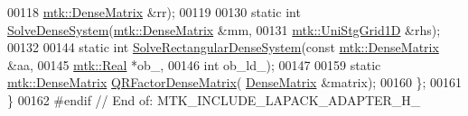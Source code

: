 \begin{DoxyCode}
00118                               \hyperlink{classmtk_1_1DenseMatrix}{mtk::DenseMatrix} &rr);
00119 
00130   \textcolor{keyword}{static} \textcolor{keywordtype}{int} \hyperlink{classmtk_1_1LAPACKAdapter_a7428bccf74fd4a4af68fb7233846da22}{SolveDenseSystem}(\hyperlink{classmtk_1_1DenseMatrix}{mtk::DenseMatrix} &mm,
00131                               \hyperlink{classmtk_1_1UniStgGrid1D}{mtk::UniStgGrid1D} &rhs);
00132 
00144   \textcolor{keyword}{static} \textcolor{keywordtype}{int} \hyperlink{classmtk_1_1LAPACKAdapter_a380f148ffdf96bae2f79ae28f1a6560c}{SolveRectangularDenseSystem}(\textcolor{keyword}{const} 
      \hyperlink{classmtk_1_1DenseMatrix}{mtk::DenseMatrix} &aa,
00145                                          \hyperlink{group__c01-roots_gac080bbbf5cbb5502c9f00405f894857d}{mtk::Real} *ob\_,
00146                                          \textcolor{keywordtype}{int} ob\_ld\_);
00147 
00159   \textcolor{keyword}{static} \hyperlink{classmtk_1_1DenseMatrix}{mtk::DenseMatrix} \hyperlink{classmtk_1_1LAPACKAdapter_ae5c6e78c9c819c9ac7a6f31bfd011d7a}{QRFactorDenseMatrix}(
      \hyperlink{classmtk_1_1DenseMatrix}{DenseMatrix} &matrix);
00160 \};
00161 \}
00162 \textcolor{preprocessor}{#endif  // End of: MTK\_INCLUDE\_LAPACK\_ADAPTER\_H\_}
\end{DoxyCode}
